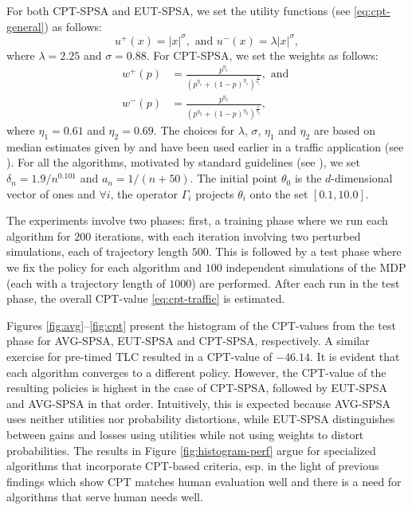 For both CPT-SPSA and EUT-SPSA, we set the utility functions (see \eqref{eq:cpt-general}) as follows:
$$u^+(x) =  |x|^{\sigma}, \text{ and  }u^-(x) = \lambda |x|^{\sigma},$$ 
where $\lambda = 2.25$ and $\sigma = 0.88$.
For CPT-SPSA, we set the weights as follows:
\begin{align*}
w^+(p) &= \frac{p^{\eta_1}}{{(p^{\eta_1}+ (1-p)^{\eta_1})}^{\frac{1}{\eta_1}}}, \text{ and }\\  
w^-(p) &= \frac{p^{\eta_2}}{{(p^{\eta_2}+ (1-p)^{\eta_2})}^{\frac{1}{\eta_2}}},
\end{align*} 
where $\eta_1 = 0.61$ and $\eta_2 = 0.69$. The choices for $\lambda$, $\sigma$, $\eta_1$ and $\eta_2$ are based on median estimates given by \cite{tversky1992advances} and have been used earlier in a traffic application (see \cite{gao2010adaptive}).
For all the algorithms,
 motivated by standard guidelines (see \cite{spall2005introduction}),
 we set $\delta_n = 1.9/n^{0.101}$ and $a_n = 1/(n+50)$. The initial point $\theta_0$ is the $d$-dimensional vector of ones and $\forall i$, the operator $\Gamma_i$ projects $\theta_i$ onto the set $[0.1, 10.0]$.
    
The experiments involve two phases:
first, a training phase where we run each algorithm for $200$ iterations, with each iteration involving two perturbed simulations, each of trajectory length $500$. This is followed by a test phase where we fix the policy for each algorithm and $100$ independent simulations of the MDP (each with a trajectory length of $1000$) are performed. After each run in the test phase, the overall CPT-value \eqref{eq:cpt-traffic} is estimated. 

Figures \ref{fig:avg}--\ref{fig:cpt} present the histogram of the CPT-values from the test phase for AVG-SPSA, EUT-SPSA and CPT-SPSA, respectively.  A similar exercise for pre-timed TLC resulted in a CPT-value of $-46.14$. It is evident that each algorithm converges to a different policy. However, the CPT-value of the resulting policies is highest in the case of CPT-SPSA, followed by EUT-SPSA and AVG-SPSA in that order. Intuitively, this is expected because AVG-SPSA uses neither utilities nor probability distortions, while EUT-SPSA distinguishes between gains and losses using utilities while not using weights to distort probabilities.
The results in Figure \ref{fig:histogram-perf} argue for specialized algorithms that incorporate CPT-based criteria, esp. in the light of previous findings which show CPT matches human evaluation well and there is a need for algorithms that serve human needs well.

